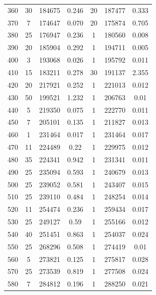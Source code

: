 \documentclass[a4paper,12pt]{article}
\begin{document}
\begin{center}
\begin{longtable}{|c|c|c|c|c|c|c|}
360   &   30   &   184675   &   0.246   &   20   &   187477   &   0.333  \\
370   &   7   &   174647   &   0.070   &   20   &   175874   &   0.705  \\
380   &   25   &   176947   &   0.236   &   1   &   180560   &   0.008  \\
390   &   20   &   185904   &   0.292   &   1   &   194711   &   0.005  \\
400   &   3   &   193068   &   0.026   &   1   &   195792   &   0.011  \\
410   &   15   &   183211   &   0.278   &   30   &   191137   &   2.355  \\
420   &   20   &   217921   &   0.252   &   1   &   221013   &   0.012  \\
430   &   50   &   199521   &   1.232   &   1   &   206763   &   0.01  \\
440   &   5   &   219350   &   0.075   &   1   &   222770   &   0.011  \\
450   &   7   &   205101   &   0.135   &   1   &   211827   &   0.013  \\
460   &   1   &   231464   &   0.017   &   1   &   231464   &   0.017  \\
470   &   11   &   224489   &   0.22   &   1   &   229975   &   0.012  \\
480   &   35   &   224341   &   0.942   &   1   &   231341   &   0.011  \\
490   &   25   &   235094   &   0.593   &   1   &   240679   &   0.013  \\
500   &   25   &   239052   &   0.581   &   1   &   243407   &   0.015  \\
510   &   25   &   239110   &   0.484   &   1   &   248254   &   0.014  \\ 
520   &   11   &   254474   &   0.236   &   1   &   259434   &   0.017  \\
530   &   25   &   249127   &   0.59   &   1   &   255166   &   0.012  \\
540   &   40   &   251451   &   0.863   &   1   &   254037   &   0.024  \\
550   &   25   &   268296   &   0.508   &   1   &   274419   &   0.01  \\
560   &   5   &   273821   &   0.125   &   1   &   275817   &   0.028  \\
570   &   25   &   273539   &   0.819   &   1   &   277508   &   0.024  \\
580   &   7   &   284812   &   0.196   &   1   &   288250   &   0.021  \\

\end{longtable}
\end{center}
\end{document}
